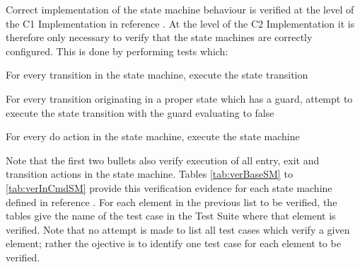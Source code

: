 \documentclass[a4paper,10pt]{article}
\newenvironment{fw_enumerate}					%
{\begin{enumerate}
  \setlength{\itemsep}{1mm}
  \setlength{\parskip}{0pt}
  \setlength{\parsep}{0pt}}
{\end{enumerate}}
\begin{document}
Correct implementation of the state machine behaviour is verified at the level of the C1 Implementation in reference \cite{ref:C1UserReq}. At the level of the C2 Implementation it is therefore only necessary to verify that the state machines are correctly configured. This is done by performing tests which:

\begin{fw_enumerate}
\item For every transition in the state machine, execute the state transition 
\item For every transition originating in a proper state which has a guard, attempt to execute the state transition with the guard evaluating to false
\item For every do action in the state machine, execute the state machine
\end{fw_enumerate}

Note that the first two bullets also verify execution of all entry, exit and transition actions in the state machine. Tables \ref{tab:verBaseSM} to \ref{tab:verInCmdSM} provide this verification evidence for each state machine defined in reference \cite{ref:cordetfw}. For each element in the previous list to be verified, the tables give the name of the test case in the Test Suite where that element is verified. Note that no attempt is made to list all test cases which verify a given element; rather the ojective is to identify one test case for each element to be verified. 
\end{document}
